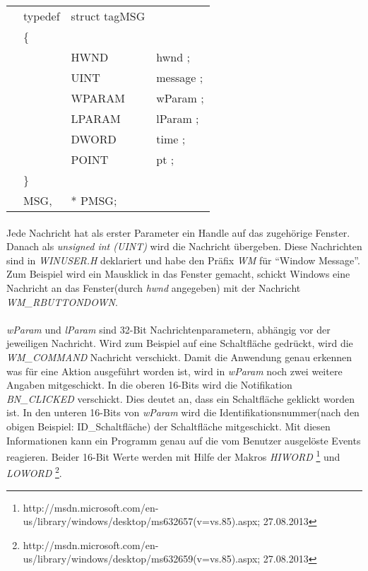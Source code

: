 \begin{tabular}{llll}
& typedef & struct tagMSG\\
& \{\\
&  & HWND   & hwnd ;\\
&  & UINT   & message ;\\
&  & WPARAM & wParam ;\\
&  & LPARAM & lParam ;\\
&  & DWORD  & time ;\\
&  & POINT  & pt ;\\
& \}\\
& MSG,&* PMSG;\\
\end{tabular}

\paragraph{}
Jede Nachricht hat als erster Parameter ein Handle auf das zugehörige Fenster. Danach als \textit{unsigned int (UINT)} wird die Nachricht übergeben. Diese Nachrichten sind in \textit{WINUSER.H} deklariert und habe den Präfix \textit{WM} für "`Window Message"'. Zum Beispiel wird ein Mausklick in das Fenster gemacht, schickt Windows eine Nachricht an das Fenster(durch \textit{hwnd} angegeben) mit der Nachricht \textit{WM\_RBUTTONDOWN}.

\paragraph{}
\textit{wParam} und \textit{lParam} sind 32-Bit Nachrichtenparametern, abhängig vor der jeweiligen Nachricht. Wird zum Beispiel auf eine Schaltfläche gedrückt, wird die \textit{WM\_COMMAND} Nachricht verschickt. Damit die Anwendung genau erkennen was für eine Aktion ausgeführt worden ist, wird in \textit{wParam} noch zwei weitere Angaben mitgeschickt. In die oberen 16-Bits wird die Notifikation \textit{BN\_CLICKED} verschickt. Dies deutet an, dass ein Schaltfläche geklickt worden ist. In den unteren 16-Bits von \textit{wParam} wird die Identifikationsnummer(nach den obigen Beispiel: ID\_Schaltfläche) der Schaltfläche mitgeschickt. Mit diesen Informationen kann ein Programm genau auf die vom Benutzer ausgelöste Events reagieren. Beider 16-Bit Werte werden mit Hilfe der Makros \textit{HIWORD} \footnote{http://msdn.microsoft.com/en-us/library/windows/desktop/ms632657(v=vs.85).aspx; 27.08.2013} und \textit{LOWORD} \footnote{http://msdn.microsoft.com/en-us/library/windows/desktop/ms632659(v=vs.85).aspx; 27.08.2013}.

